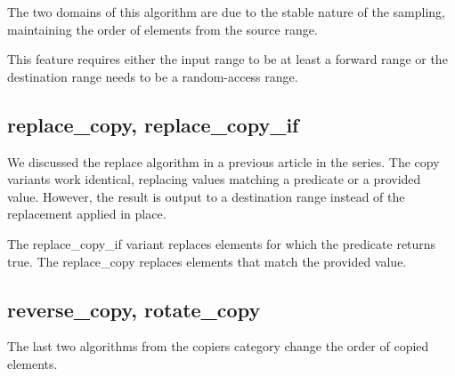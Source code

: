 The two domains of this algorithm are due to the stable nature of the sampling, maintaining the order of elements from the source range.

This feature requires either the input range to be at least a forward range or the destination range needs to be a random-access range.

\subsection{replace\_copy, replace\_copy\_if}

We discussed the replace algorithm in a previous article in the series. The copy variants work identical, replacing values matching a predicate or a provided value. However, the result is output to a destination range instead of the replacement applied in place.



The replace\_copy\_if variant replaces elements for which the predicate returns true. The replace\_copy replaces elements that match the provided value.

\begin{box-note}
\end{box-note}

\subsection{reverse\_copy, rotate\_copy}

The last two algorithms from the copiers category change the order of copied elements.




